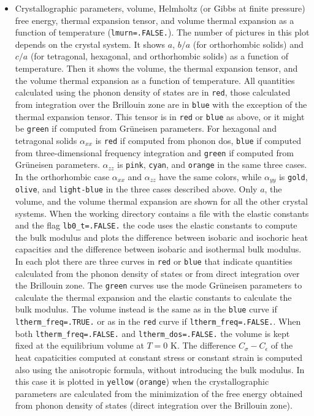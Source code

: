\documentclass[12pt,a4paper]{article}
\begin{document}
\begin{itemize}
\item
Crystallographic parameters, volume, Helmholtz (or Gibbs at finite pressure)
free energy, thermal expansion tensor, and 
volume thermal expansion as a function of temperature 
(\texttt{lmurn=.FALSE.}). The number of
pictures in this plot depends on the crystal system. It shows $a$, 
$b/a$ (for orthorhombic solids) and $c/a$ (for tetragonal, hexagonal, and 
orthorhombic solids) as a function of temperature. Then it shows the
volume, the thermal expansion tensor, and the volume thermal expansion as
a function of temperature. All quantities calculated using the phonon 
density of states are in \texttt{red}, those calculated from integration
over the Brillouin zone are in \texttt{blue} with the exception of the
thermal expansion tensor. This tensor is in \texttt{red} or \texttt{blue}
as above, or it might be \texttt{green} if computed from Gr\"uneisen
parameters. For hexagonal and tetragonal solids $\alpha_{xx}$ is \texttt{red}
if computed from phonon dos, \texttt{blue} if computed from three-dimensional
frequency integration and \texttt{green} if computed from Gr\"uneisen 
parameters. $\alpha_{zz}$ is \texttt{pink}, \texttt{cyan}, and \texttt{orange}
in the same three cases.
In the orthorhombic case $\alpha_{xx}$ and $\alpha_{zz}$ have the same
colors, while $\alpha_{yy}$ is \texttt{gold}, \texttt{olive}, and 
\texttt{light-blue} in the three cases described above.
Only $a$, the volume, and the volume thermal expansion are shown 
for all the other crystal systems.
When the working directory contains a file with the elastic constants and
the flag \texttt{lb0\_t=.FALSE.} the code uses the elastic constants to
compute the bulk modulus and plots the difference between isobaric and
isochoric heat capacities and the difference between isobaric and isothermal
bulk modulus. In each plot there are three curves in \texttt{red} or
\texttt{blue} that indicate quantities calculated
from the phonon density of states or from direct integration over the
Brillouin zone. The \texttt{green} curves use the 
mode Gr\"uneisen parameters to calculate the thermal expansion and
the elastic constants to calculate the bulk modulus. The volume instead
is the same as in the \texttt{blue} curve if \texttt{ltherm\_freq=.TRUE.}
or as in the \texttt{red} curve if \texttt{ltherm\_freq=.FALSE.}.
When both \texttt{ltherm\_freq=.FALSE.} and \texttt{ltherm\_dos=.FALSE.}
the volume is kept fixed at the equilibrium volume at $T=0$ K.
The difference $C_\sigma-C_\epsilon$ of the heat capaticities computed at
constant stress or constant strain is computed also using the anisotropic
formula, without introducing the bulk modulus. In this case it is
plotted in \texttt{yellow} (\texttt{orange}) when the crystallographic 
parameters are calculated from the minimization of the free energy 
obtained from phonon density of states (direct integration over the 
Brillouin zone).


\end{itemize}
\end{document}
